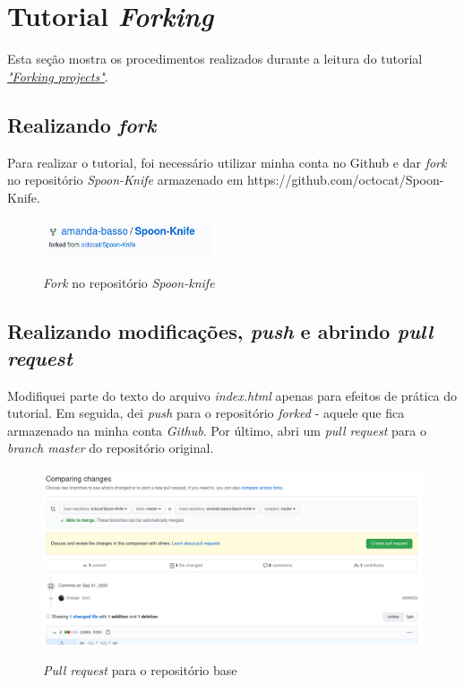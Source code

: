 \section{Tutorial \textit{Forking}}
    Esta seção mostra os procedimentos realizados durante a leitura do tutorial \href{https://guides.github.com/activities/forking/}{\textit{"Forking projects"}}.
    
    \subsection{Realizando \textit{fork}}
    Para realizar o tutorial, foi necessário utilizar minha conta no Github e dar \textit{fork} no repositório \textit{Spoon-Knife} armazenado em https://github.com/octocat/Spoon-Knife.
    
    \begin{figure}[H]
        \caption{\textit{Fork} no repositório \textit{Spoon-knife}}
        \vspace{0.5cm}
        \centering
        \includegraphics[width=5cm]{imagens/fork.png}
        \label{figura:fork}
    \end{figure}

    \subsection{Realizando modificações, \textit{push} e abrindo \textit{pull request}}
    Modifiquei parte do texto do arquivo \textit{index.html} apenas para efeitos de prática do tutorial. Em seguida, dei \textit{push} para o repositório \textit{forked} - aquele que fica armazenado na minha conta \textit{Github}. Por último, abri um \textit{pull request} para o \textit{branch master} do repositório original.
    \begin{figure}[H]
        \caption{\textit{Pull request} para o repositório base}
        \vspace{0.5cm}
        \centering
        \includegraphics[width=15cm]{imagens/pull_request_fork.png}
        \label{figura:pull_request_fork}
    \end{figure}

